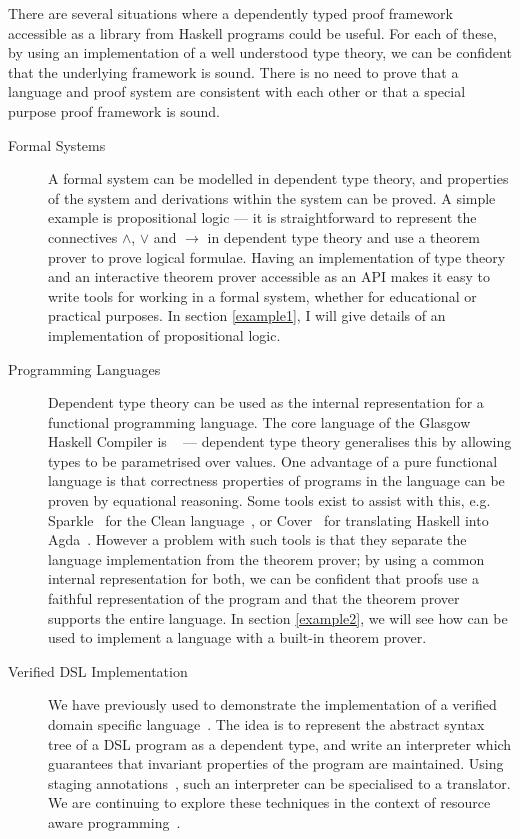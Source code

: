 There are several situations where a dependently typed proof framework
accessible as a library from Haskell programs could be useful.  For
each of these, by using an implementation of a well understood type
theory, we can be confident that the underlying framework is
sound. There is no need to prove that a language and proof system are
consistent with each other or that a special purpose proof framework is
sound.

\begin{description}
\item[Formal Systems] 
A formal system can be modelled in dependent type theory, and
properties of the system and derivations within the system can be
proved. A simple example is propositional logic --- it is
straightforward to represent the connectives $\land$, $\lor$ and $\to$
in dependent type theory and use a theorem prover to prove logical
formulae.
Having an implementation of type theory and an interactive theorem
prover accessible as an API makes it easy to write tools for working
in a formal system, whether for educational or practical purposes.
In section \ref{example1}, I will give details of an implementation of
propositional logic.

\item[Programming Languages] 
Dependent type theory can be used as the internal representation for a
functional programming language. The core language of the Glasgow
Haskell Compiler is \SystemF{}~\cite{core} --- dependent type theory
generalises this by allowing types to be parametrised over values.
One advantage of a pure functional language is that correctness
properties of programs in the language can be proven by equational
reasoning.  Some tools exist to assist with this,
e.g. Sparkle~\cite{sparkle} for the Clean language~\cite{clean}, or
Cover~\cite{cover} for translating Haskell into
Agda~\cite{agda}. However a problem with such tools is that they
separate the language implementation from the theorem prover; by using
a common internal representation for both, we can be confident that
proofs use a faithful representation of the program and that the
theorem prover supports the entire language. In section
\ref{example2}, we will see how \Ivor{} can be used to implement a
language with a built-in theorem prover.

\item[Verified DSL Implementation]
We have previously used \Ivor{} to demonstrate the implementation of
a verified domain specific language~\cite{dtpmsp-gpce}. The idea is to
represent the abstract syntax tree of a DSL program as a dependent
type, and write an interpreter which guarantees that invariant
properties of the program are maintained. Using staging
annotations~\cite{multi-taha}, such an interpreter can be specialised
to a translator. We are continuing to explore these techniques in the
context of resource aware programming~\cite{dt-framework}.

\end{description}


